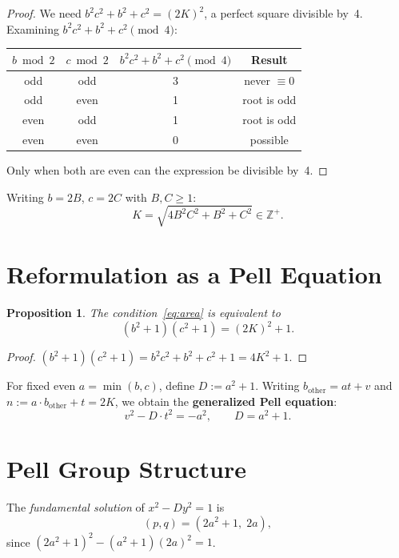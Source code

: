 \documentclass[11pt]{article}
\newtheorem{proposition}[theorem]{Proposition}
\begin{document}
\begin{proof}
We need $b^2c^2 + b^2 + c^2 = (2K)^2$, a perfect square divisible by~4.
Examining $b^2c^2 + b^2 + c^2 \pmod{4}$:

\begin{center}
\begin{tabular}{cccc}
\toprule
$b \bmod 2$ & $c \bmod 2$ & $b^2c^2+b^2+c^2 \pmod{4}$ & Result \\
\midrule
odd & odd & 3 & never $\equiv 0$ \\
odd & even & 1 & root is odd \\
even & odd & 1 & root is odd \\
even & even & 0 & possible \\
\bottomrule
\end{tabular}
\end{center}
Only when both are even can the expression be divisible by~4.
\end{proof}

Writing $b = 2B$, $c = 2C$ with $B, C \ge 1$:
\begin{equation}\label{eq:area}
  K = \sqrt{4B^2C^2 + B^2 + C^2} \in \mathbb{Z}^+.
\end{equation}

\section{Reformulation as a Pell Equation}

\begin{proposition}
The condition~\eqref{eq:area} is equivalent to
\[
  (b^2+1)(c^2+1) = (2K)^2 + 1.
\]
\end{proposition}

\begin{proof}
$(b^2+1)(c^2+1) = b^2c^2 + b^2 + c^2 + 1 = 4K^2 + 1$.
\end{proof}

For fixed even $a = \min(b,c)$, define $D := a^2+1$. Writing
$b_{\text{other}} = at + v$ and $n := a \cdot b_{\text{other}} + t = 2K$,
we obtain the \textbf{generalized Pell equation}:
\begin{equation}\label{eq:pell}
  v^2 - D \cdot t^2 = -a^2,
  \qquad D = a^2+1.
\end{equation}

\section{Pell Group Structure}

The \emph{fundamental solution} of $x^2 - Dy^2 = 1$ is
\[
  (p, q) = (2a^2+1,\; 2a),
\]
since $(2a^2+1)^2 - (a^2+1)(2a)^2 = 1$.
\end{document}
